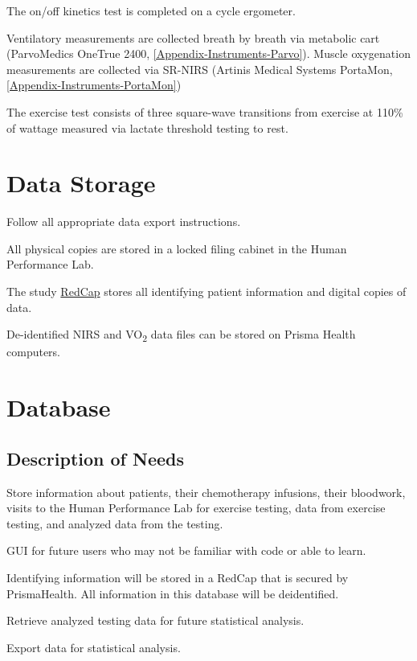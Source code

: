 \documentclass[
]{book}
\begin{document}
The on/off kinetics test is completed on a cycle ergometer.

Ventilatory measurements are collected breath by breath via metabolic cart (ParvoMedics OneTrue 2400, \ref{Appendix-Instruments-Parvo}). Muscle oxygenation measurements are collected via SR-NIRS (Artinis Medical Systems PortaMon, \ref{Appendix-Instruments-PortaMon})

The exercise test consists of three square-wave transitions from exercise at 110\% of wattage measured via lactate threshold testing to rest.

\hypertarget{DataStorage}{%
\chapter{Data Storage}\label{DataStorage}}

Follow all appropriate data export instructions.

All physical copies are stored in a locked filing cabinet in the Human Performance Lab.

The study \href{https://redcap.prismahealth.org}{RedCap} stores all identifying patient information and digital copies of data.

De-identified NIRS and VO\textsubscript{2} data files can be stored on Prisma Health computers.

\hypertarget{database}{%
\chapter{Database}\label{database}}

\hypertarget{description-of-needs}{%
\section{Description of Needs}\label{description-of-needs}}

Store information about patients, their chemotherapy infusions, their bloodwork, visits to the Human Performance Lab for exercise testing, data from exercise testing, and analyzed data from the testing.

GUI for future users who may not be familiar with code or able to learn.

Identifying information will be stored in a RedCap that is secured by PrismaHealth. All information in this database will be deidentified.

Retrieve analyzed testing data for future statistical analysis.

Export data for statistical analysis.
\end{document}
